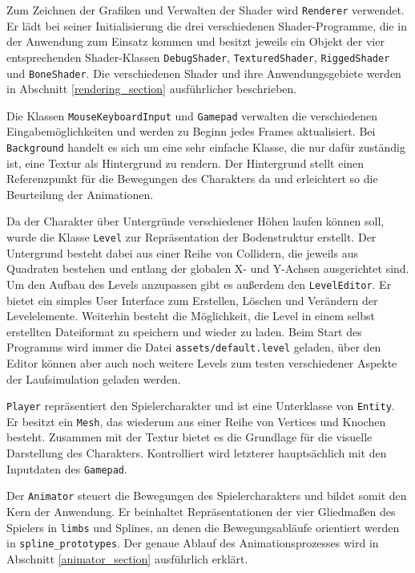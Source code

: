 Zum Zeichnen der Grafiken und Verwalten der Shader wird \lstinline{Renderer} verwendet. Er lädt bei seiner Initialisierung die drei verschiedenen Shader-Programme, die in der Anwendung zum Einsatz kommen und besitzt jeweils ein Objekt der vier entsprechenden Shader-Klassen \lstinline{DebugShader}, \lstinline{TexturedShader}, \lstinline{RiggedShader} und \lstinline{BoneShader}. Die verschiedenen Shader und ihre Anwendungsgebiete werden in Abschnitt \ref{rendering_section} ausführlicher beschrieben.

Die Klassen \lstinline {MouseKeyboardInput} und \lstinline{Gamepad} verwalten die verschiedenen Eingabemöglichkeiten und werden zu Beginn jedes Frames aktualisiert. Bei \lstinline{Background} handelt es sich um eine sehr einfache Klasse, die nur dafür zuständig ist, eine Textur als Hintergrund zu rendern. Der Hintergrund stellt einen Referenzpunkt für die Bewegungen des Charakters da und erleichtert so die Beurteilung der Animationen.

Da der Charakter über Untergründe verschiedener Höhen laufen können soll, wurde die Klasse \lstinline{Level} zur Repräsentation der Bodenstruktur erstellt. Der Untergrund besteht dabei aus einer Reihe von Collidern, die jeweils aus Quadraten bestehen und entlang der globalen X- und Y-Achsen ausgerichtet sind. Um den Aufbau des Levels anzupassen gibt es außerdem den \lstinline{LevelEditor}. Er bietet ein simples User Interface zum Erstellen, Löschen und Verändern der Levelelemente. Weiterhin besteht die Möglichkeit, die Level in einem selbst erstellten Dateiformat zu speichern und wieder zu laden. Beim Start des Programms wird immer die Datei \lstinline{assets/default.level} geladen, über den Editor können aber auch noch weitere Levels zum testen verschiedener Aspekte der Laufsimulation geladen werden.

\lstinline{Player} repräsentiert den Spielercharakter und ist eine Unterklasse von \lstinline{Entity}. Er besitzt ein \lstinline{Mesh}, das wiederum aus einer Reihe von Vertices und Knochen besteht. Zusammen mit der Textur bietet es die Grundlage für die visuelle Darstellung des Charakters. Kontrolliert wird letzterer hauptsächlich mit den Inputdaten des \lstinline{Gamepad}.

Der \lstinline{Animator} steuert die Bewegungen des Spielercharakters und bildet somit den Kern der Anwendung. Er beinhaltet Repräsentationen der vier Gliedmaßen des Spielers in \lstinline{limbs} und Splines, an denen die Bewegungsabläufe orientiert werden in \lstinline{spline_prototypes}. Der genaue Ablauf des Animationsprozesses wird in Abschnitt \ref{animator_section} ausführlich erklärt.


